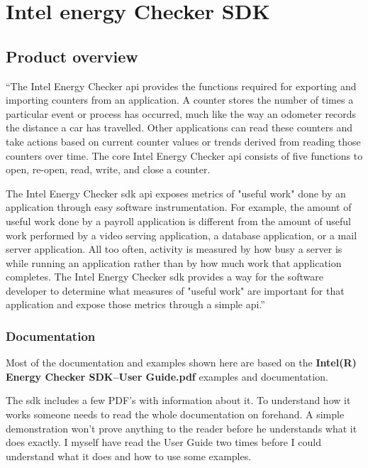 \section{Intel energy Checker SDK}\label{sec:IntelSDK}
\subsection{Product overview}
``The Intel\textsuperscript{\textregistered} Energy Checker \gls{api} provides the functions required for exporting and importing counters from an application. A counter stores the number of times a particular event or process has occurred, much like the way an odometer records the distance a car has travelled. Other applications can read these counters and take actions based on current counter values or trends derived from reading those counters over time. The core Intel\textsuperscript{\textregistered} Energy Checker \gls{api} consists of five functions to open, re-open, read, write, and close a counter.

The Intel\textsuperscript{\textregistered} Energy Checker \gls{sdk} \gls{api} exposes metrics of "useful work" done by an application through easy software instrumentation. For example, the amount of useful work done by a payroll application is different from the amount of useful work performed by a video serving application, a database application, or a mail server application. All too often, activity is measured by how busy a server is while running an application rather than by how much work that application completes. The Intel\textsuperscript{\textregistered} Energy Checker \gls{sdk} provides a way for the software developer to determine what measures of "useful work" are important for that application and expose those metrics through a simple \gls{api}.''\cite{intel_ec_sdk_website}  
\nolinebreak
\subsubsection{Documentation}
Most of the documentation and examples shown here are based on the \textbf{Intel(R) Energy Checker SDK--User Guide.pdf}\cite{intel_userGuide} examples and documentation. 

The \gls{sdk} includes a few PDF's with information about it. To understand how it works someone needs to read the whole documentation on forehand. A simple demonstration won't prove anything to the reader before he understands what it does exactly. I myself have read the User Guide two times before I could understand what it does and how to use some examples.

